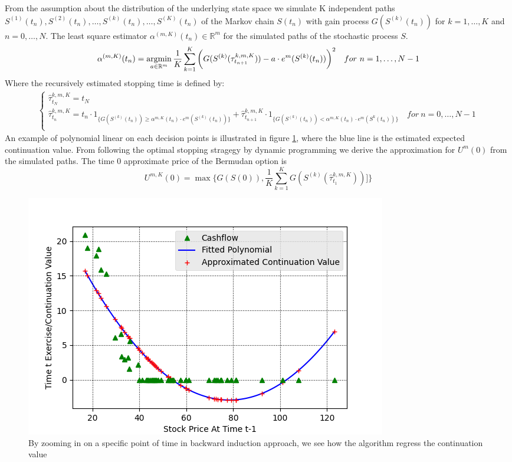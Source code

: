 From the assumption about the distribution of the underlying state space we simulate K independent paths $S^{(1)}(t_n), S^{(2)}(t_n), \ldots, S^{(k)}(t_n), \ldots, S^{(K)}(t_n)$ of the Markov chain $S(t_n)$ with gain process $G(S^{(k)}(t_n))$ for $k=1, \ldots, K$ and $n=0,\ldots,N$. The least square estimator $\alpha^{(m,K)}(t_n)\in \mathbb{R}^m$ for the simulated paths of the stochastic process $S$.
\begin{equation}
\alpha^{(m,K)}(t_n)= \operatorname*{argmin}_{a\in \mathbb{R}^m} \dfrac{1}{K}\sum_{k=1}^{K} \bigg(G(S^{(k)}(\tau^{k,m,K}_{t_{n+1}}))  -a \cdot e^m(S^{(k)}(t_{n})) \bigg)^2 \quad for \ n=1, \ldots, N-1
\end{equation}
Where the recursively estimated stopping time is defined by:
\begin{equation}\label{LSMDynamic3}
\begin{split}
\begin{cases}
          \hat{\tau}_{t_N}^{k,m,K} = t_N\\
          \hat{\tau}_{t_n}^{k,m,K} = t_n \cdot 1_{\{G(S^{(k)}(t_n)) \geq \alpha^{m,K}(t_{n}) \cdot e^m(S^{(k)}(t_{n})) \}} + \hat{\tau}_{t_{n+1}}^{k,m,K} \cdot 1_{\{G(S^{(k)}(t_n)) < \alpha^{m,K}(t_{n}) \cdot e^m(S^{k}(t_{n})) \}} \quad for \ n={0,\ldots,N-1} \\ 
\end{cases}
\end{split}
\end{equation}
An example of polynomial linear on each decision points is illustrated in figure \ref{fig:LSM1}, where the blue line is the estimated expected continuation value. From following the optimal stopping stragegy by dynamic programming we derive the approximation for $U^{m}(0)$ from the simulated paths. The time 0 approximate price of the Bermudan option is
\begin{equation}
U^{m,K}(0) = \max \{ G(S(0)), \frac{1}{K} \sum_{k=1}^{K} G(S^{(k)}(\hat{\tau}^{k,m,K}_{t_1}))]\}
\end{equation}

\begin{figure}[th]
\centering
\includegraphics{Figures/LSMFit1.png}
\decoRule
\caption[Polynomial Regression Of Continuation Value]{By zooming in on a specific point of time in backward induction approach, we see how the algorithm regress the continuation value}
\label{fig:LSM1}
\end{figure}

